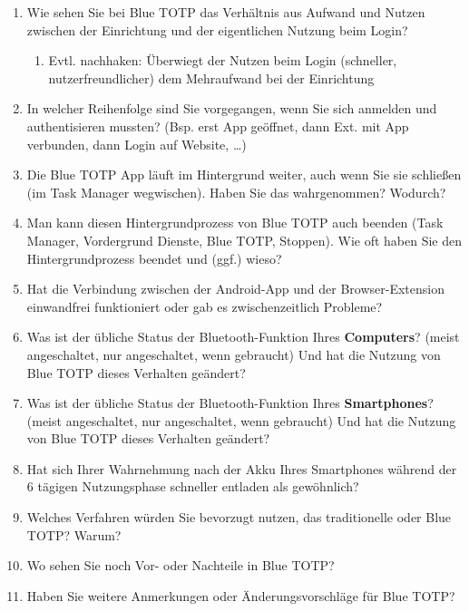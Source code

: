\begin{enumerate}
    \item Wie sehen Sie bei Blue TOTP das Verhältnis aus Aufwand und Nutzen zwischen der Einrichtung und der eigentlichen Nutzung beim Login?
    \begin{enumerate}
        \item Evtl. nachhaken: Überwiegt der Nutzen beim Login (schneller, nutzerfreundlicher) dem Mehraufwand bei der Einrichtung
    \end{enumerate}
    \item In welcher Reihenfolge sind Sie vorgegangen, wenn Sie sich anmelden und authentisieren mussten? (Bsp. erst  App geöffnet, dann Ext. mit App verbunden, dann Login auf Website, …)
    \item Die Blue TOTP App läuft im Hintergrund weiter, auch wenn Sie sie schließen (im Task Manager wegwischen). Haben Sie das wahrgenommen? Wodurch?
    \item Man kann diesen Hintergrundprozess von Blue TOTP auch beenden (Task Manager, Vordergrund Dienste, Blue TOTP, Stoppen). Wie oft haben Sie den Hintergrundprozess beendet und (ggf.) wieso?
    \item Hat die Verbindung zwischen der Android-App und der Browser-Extension einwandfrei funktioniert oder gab es zwischenzeitlich Probleme?
    \item Was ist der übliche Status der Bluetooth-Funktion Ihres \textbf{Computers}? (meist angeschaltet, nur angeschaltet, wenn gebraucht) Und hat die Nutzung von Blue TOTP dieses Verhalten geändert?
    \item Was ist der übliche Status der Bluetooth-Funktion Ihres \textbf{Smartphones}? (meist angeschaltet, nur angeschaltet, wenn gebraucht) Und hat die Nutzung von Blue TOTP dieses Verhalten geändert?
    \item Hat sich Ihrer Wahrnehmung nach der Akku Ihres Smartphones während der 6 tägigen Nutzungsphase schneller entladen als gewöhnlich?
    \item Welches Verfahren würden Sie bevorzugt nutzen, das traditionelle oder Blue TOTP? Warum?
    \item Wo sehen Sie noch Vor- oder Nachteile in Blue TOTP?
    \item Haben Sie weitere Anmerkungen oder Änderungsvorschläge für Blue TOTP?
\end{enumerate}